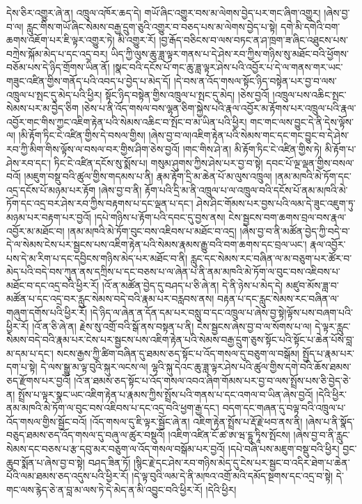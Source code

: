 དེས་ཅིར་འགྱུར་ཞེ་ན། འཁྲུལ་འཁོར་ཆད་དེ། གཡོ་ཞིང་འགྱུར་བས་མ་ལེགས་བྱེད་པར་གང་ཞིག་འགྱུར། །ཞེས་བྱ་བ་ལ། རླུང་གིས་གཡོ་ཞིང་སེམས་བརྒྱ་དྲུག་ཅུའི་འགྱུར་བ་བཅད་པས་མ་ལེགས་བྱེད་པ་སྟེ། དགེ་མི་དགེའི་བག་ཆགས་འཇོག་པར་ཇི་ལྟར་འགྱུར་ཏེ། མི་འགྱུར་རོ། །བྱ་རྒོད་བཅིངས་བ་ལས་བཏང་ན་ཤ་ཁྲག་ཟ་ཞིང་འཐུངས་པས་བཀྲེས་སྐོམ་མེད་པ་དང་འདྲ་བར། ཡིད་ཀྱི་ལུས་ཆུ་ཟླ་ལྟར་གནས་པ་དེ་ཤེས་རབ་ཀྱིས་གཉིས་སུ་མཐོང་བའི་ཕྱོགས་བཅོམ་པས་དེ་ཉིད་གྲོགས་ཡིན་ནོ། །སྣང་བའི་དངོས་པོ་གང་ཆུ་ཟླ་ལྟར་ཤེས་པའི་འབྱོར་པ་དེ་ལ་གནས་གར་ཡང་གཟུང་འཛིན་གྱིས་གནོད་པའི་འབད་པ་བྱེད་པ་མེད་དོ། །དེ་བས་ན་འོད་གསལ་སྟོང་ཉིད་བསྟེན་པར་བྱ་བ་ལས་འཁྲུལ་པ་སྤང་དུ་མེད་པའི་ཕྱིར། སྟོང་ཉིད་བསྟེན་གྱིས་འཁྲུལ་པ་སྤང་དུ་མེད། །ཅེས་བྱའོ། །འཁྲུལ་པས་འཆིང་སྤང་སེམས་པར་མ་བྱེད་ཅིག །ཅེས་པ་ནི་འོད་གསལ་བས་ལྷན་ཅིག་སྐྱེས་པའི་རྣལ་འབྱོར་མ་རྟོགས་པར་འཁྲུལ་པའི་རྣལ་འབྱོར་གང་གིས་ཀྱང་འཇིག་རྟེན་པའི་སེམས་འཆིང་བ་སྤོང་བ་མ་ཡིན་པའི་ཕྱིར། གང་གང་ལས་བྱུང་དེ་ནི་དེས་ལྟོས་ལ། །མི་རྟོག་ཏིང་ངེ་འཛིན་གྱིས་དེ་བསལ་གྱིས། །ཞེས་བྱ་བ་ལ།འཇིག་རྟེན་པའི་སེམས་གང་དང་གང་བྱུང་བ་དེ་ཤེས་རབ་ཀྱི་མིག་གིས་ལྟོས་ལ་བསལ་བར་གྱིས་ཤིག་ཅེས་བྱའོ། །གང་གིས་ཤེ་ན། མི་རྟོག་ཏིང་ངེ་འཛིན་གྱིས་ཏེ། མི་རྟོག་པ་ཤེས་རབ་དང་། ཏིང་ངེ་འཛིན་དངོས་སུ་སྨོས་པ། གསུམ་ཤུགས་ཀྱིས་ཤེས་པར་བྱ་བ་སྟེ། དབང་པོ་ལྔ་ལྡན་གྱིས་བསལ་བའོ། །མཇུག་བསྡུ་བའི་ཚུལ་གྱིས་གདམས་པ་ནི། རྣམ་རྟོག་དྲི་མ་ཆེན་པོ་མ་ལུས་འཁྲུལ། །ནམ་མཁའི་མེ་ཏོག་དང་འདྲ་དངོས་པོ་མཉམ་པར་རྟོག །ཞེས་བྱ་བ་ནི། རྟོག་པའི་དྲི་མ་ནི་འཁྲུལ་པ་ལ་འཁྲུལ་བའི་དངོས་པོ་ནམ་མཁའི་མེ་ཏོག་དང་འདྲ་བར་ཤེས་རབ་ཀྱིས་བརྟགས་པ་དང་ལྡན་པ་དང་། ཤེས་ཤིང་གོམས་པར་བྱས་པའི་ལམ་དེ་ཟུང་འཇུག་ཏུ་མཉམ་པར་བརྟག་པར་བྱའོ། །དཔེ་གཉིས་པ་རྟོག་པའི་དབང་དུ་བྱས་ནས། ངེས་སྦྱངས་བག་ཆགས་བྲལ་བས་རྣལ་འབྱོར་མ་མཐོང་བ། །ནམ་མཁའི་མེ་ཏོག་བུང་བས་འཇིབས་པ་མཐོང་བ་འདྲ། །ཞེས་བྱ་བ་ནི་མཚོན་བྱེད་ཀྱི་བདེ་བ་དེ་ལ་སེམས་ངེས་པར་སྦྱངས་པས་འཇིག་རྟེན་པའི་སེམས་རྣམས་རྒྱུ་བའི་བག་ཆགས་དང་བྲལ་ཡང་། རྣལ་འབྱོར་པས་དེ་མ་རིག་པ་དང་དབྱིངས་གཉིས་མེད་པར་མཐོང་བ་ནི། རླུང་དང་སེམས་རང་བཞིན་ལ་མ་བཅུག་པར་ཚོར་བ་མེད་པའི་བདེ་བས་ཀུན་ནས་དཀྲིས་པ་དང་བཅས་པ་ལ་ཞེན་པ་ནི་ནམ་མཁའི་མེ་ཏོག་ལ་བུང་བས་འཇིབས་པ་མཐོང་བ་དང་འདྲ་བའི་ཕྱིར་རོ། །འོ་ན་མཚོན་བྱེད་དུ་བཤད་པ་ཅི་ཞེ་ན། དེ་ནི་ཉེས་པ་མེད་དེ། མཛུབ་མོས་ཟླ་བ་མཚོན་པ་དང་འདྲ་བར་རླུང་སེམས་བདེ་བའི་རྣམ་པར་བརླབས་ནས། བརྟན་པ་དང་རླུང་སེམས་རང་བཞིན་ལ་གཞུག་དགོས་པའི་ཕྱིར་རོ། །དེ་ཉིད་ལ་ཞེན་ན་དོན་དམ་པར་བསླུ་བ་དང་འཁྲུལ་པ་ཞེས་བྱ་སྟེ།ལྟོས་པས་བཞག་པའི་ཕྱིར་རོ། །འོ་ན་ཅི་ཞེ་ན། རྗེས་སུ་འགྲོ་བའི་སྒོ་ནས་བསྟན་པ་ནི། ངེས་སྦྱངས་ཞེས་བྱ་བ་ལ་སོགས་པ་ལ། དེ་ལྟར་རླུང་སེམས་བདེ་བའི་རྣམ་པར་ངེས་པར་སྦྱངས་པས་འཇིག་རྟེན་པའི་སེམས་བརྒྱ་དྲུག་ཅུས་སྟོང་པའི་སྟོང་པ་ཆེན་པོས་བླ་མ་དམ་པ་དང་། སངས་རྒྱས་ཀྱི་ཚིག་བཞིན་དུ་ཐམས་ཅད་སྟོང་པ་འོད་གསལ་དུ་བཅུག་ལ་བསྒོམ། སྤྱོད་པ་རྣམ་པར་དག་པ་སྟེ། དེ་ལས་སྒྱུ་མ་ལྟ་བུའི་སྐུར་ལངས་ལ། ལྷའི་སྐུ་དེའང་ཆུ་ཟླ་ལྟར་ཤེས་པའི་ཚུལ་གྱིས་དགེ་བའི་ཆོས་ཐམས་ཅད་རྫོགས་པར་བྱའོ། །འོ་ན་ཐམས་ཅད་སྟོང་པ་འོད་གསལ་འབའ་ཞིག་གོམས་པར་བྱ་བ་ལས་སྤྲོས་པས་ཅི་བྱེད་ཅེ་ན། སྤྲོས་པ་ལྟར་སྣང་ཡང་འཇིག་རྟེན་པ་རྣམས་ཀྱིས་སྤྲོས་པའི་གནས་པ་དང་འགལ་བ་ཡིན་ཞེས་བྱའོ། །དེའི་ཕྱིར་ནམ་མཁའི་མེ་ཏོག་ལ་བུང་བས་འཇིབས་པ་དང་འདྲ་བའི་ཕྱག་རྒྱ་དང་། བདག་དང་གཞན་དུ་བལྟ་བའི་འཁྲུལ་པ་འོད་གསལ་གྱིས་སྦྱོང་བའོ། །འོད་གསལ་དུ་ཇི་ལྟར་སྦྱོང་ཞེ་ན། འཇིག་རྟེན་སྤྲོས་པ་རྡོ་རྗེ་ཕབ་ནས་ནི། །ཞེས་པ་ནི་སྣོད་བཅུད་ཐམས་ཅད་འོད་གསལ་དུ་བཞུ་ལ་ཚུར་བསྡུའོ། །འཇིག་འཛིན་ངོ་ཚ་ཨ་ཝ་དྷུ་ཏཱིས་སྤོངས། །ཞེས་བྱ་བ་ནི་རླུང་སེམས་དང་བཅས་པ་རྩ་དབུ་མར་བཅུག་ལ་འོད་གསལ་བསྒོམ་པར་བྱའོ། །དཔེ་བཞི་པས་མཇུག་བསྡུ་བའི་ཕྱིར། བྱང་ཆུབ་སྨོན་པ་ཞེས་བྱ་བ་སྟེ། བཤད་ཟིན་ཏོ། །སྙིང་རྗེ་དང་ཤེས་རབ་གཉིས་མེད་དུ་ངེས་པར་སྦྱང་བ་འདིར་ཐེག་པ་ཆེན་པོའི་ལམ་ཐམས་ཅད་འདུས་པའི་ཕྱིར་རོ། །དེ་ལྟ་བུའི་ལམ་དེ་ནི་མཁའ་འགྲོ་མའི་དམོད་སྔགས་དང་འདྲ་བ་སྟེ། དེ་གང་ལས་རྙེད་ཅེ་ན་བླ་མ་ལས་ཏེ་དེ་མེད་ན་མི་འབྱུང་བའི་ཕྱིར་རོ། །དེའི་ཕྱིར། 